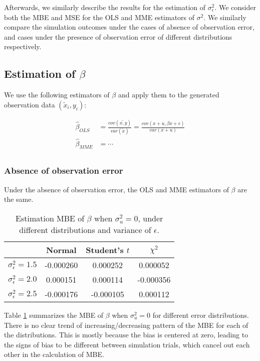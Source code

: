 \documentclass{article}
\begin{document}
Afterwards, we similarly describe the results for the estimation of $\sigma^2_\epsilon$.
We consider both the MBE and MSE for the OLS and MME estimators of $\sigma^2$.
We similarly compare the simulation outcomes under the cases of absence of observation error, and cases under the presence of observation error of different distributions respectively.

\subsection{Estimation of $\beta$}

We use the following estimators of $\beta$ and apply them to the generated observation data $(\tilde{x}_i, y_i)$:

\begin{equation}
    \begin{split}
        \hat{\beta}_{OLS} &= \frac{cov(\tilde{x, y})}{var(\tilde{x})} = \frac{cov(x+u, \beta x + \epsilon)}{var(x + u)}\\
        \hat{\beta}_{MME} &= \cdots\\
    \end{split}
\end{equation}

\subsubsection{Absence of observation error}

Under the absence of observation error, the OLS and MME estimators of $\beta$ are the same.

\begin{table}[ht]
    \centering
    \caption{Estimation MBE of $\beta$ when $\sigma^2_u=0$, under different distributions and variance of $\epsilon$.}
    \label{Tab:MBE_absence}
    \begin{tabular}[t]{lccc}
        \hline
        &Normal&Student's $t$&$\chi^2$\\
        \hline
        $\sigma^2_\epsilon = 1.5$&-0.000260& 0.000252& 0.000052\\
        $\sigma^2_\epsilon = 2.0$& 0.000151& 0.000114&-0.000356\\
        $\sigma^2_\epsilon = 2.5$&-0.000176&-0.000105& 0.000112\\
        \hline
    \end{tabular}
\end{table}

Table \ref{Tab:MBE_absence} summarizes the MBE of $\beta$ when $\sigma^2_u=0$ for different error distributions.
There is no clear trend of increasing/decreasing pattern of the MBE for each of the distributions. 
This is mostly because the bias is centered at zero, leading to the signs of bias to be different between simulation trials, which cancel out each other in the calculation of MBE. 
\end{document}
